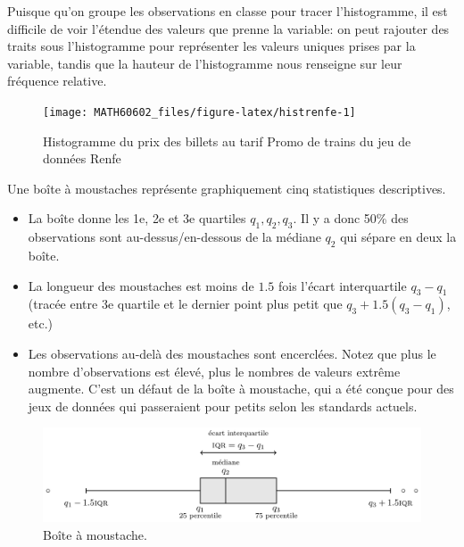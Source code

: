 \documentclass[
  11pt,
  letterpaper,
]{book}
\providecommand{\tightlist}{%
  \setlength{\itemsep}{0pt}\setlength{\parskip}{0pt}}
\theoremstyle{definition}
\theoremstyle{definition}
\theoremstyle{definition}
\theoremstyle{definition}
\theoremstyle{remark}
\begin{document}
Puisque qu'on groupe les observations en classe pour tracer l'histogramme, il est difficile de voir l'étendue des valeurs que prenne la variable: on peut rajouter des traits sous l'histogramme pour représenter les valeurs uniques prises par la variable, tandis que la hauteur de l'histogramme nous renseigne sur leur fréquence relative.

\begin{figure}

{\centering \texttt{[image: MATH60602\_files/figure-latex/histrenfe-1]} 

}

\caption{Histogramme du prix des billets au tarif Promo de trains du jeu de données Renfe}\label{fig:histrenfe}
\end{figure}

Une boîte à moustaches représente graphiquement cinq statistiques descriptives.

\begin{itemize}
\tightlist
\item
  La boîte donne les 1e, 2e et 3e quartiles \(q_1, q_2, q_3\). Il y a donc 50\% des observations sont au-dessus/en-dessous de la médiane \(q_2\) qui sépare en deux la boîte.
\item
  La longueur des moustaches est moins de \(1.5\) fois l'écart interquartile \(q_3-q_1\) (tracée entre 3e quartile et le dernier point plus petit que \(q_3+1.5(q_3-q_1)\), etc.)
\item
  Les observations au-delà des moustaches sont encerclées. Notez que plus le nombre d'observations est élevé, plus le nombres de valeurs extrême augmente. C'est un défaut de la boîte à moustache, qui a été conçue pour des jeux de données qui passeraient pour petits selon les standards actuels.
\end{itemize}

\begin{figure}

{\centering \includegraphics[width=0.7\linewidth]{figures/01-intro-boiteamoustache} 

}

\caption{Boîte à moustache.}\label{fig:boiteamoustache}
\end{figure}
\end{document}

